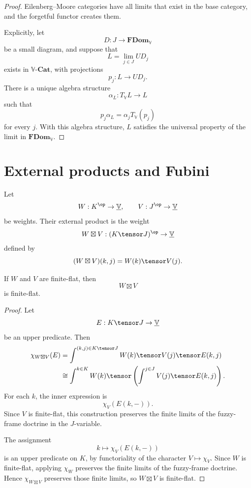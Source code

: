 \begin{proof}
Eilenberg--Moore categories have all limits that exist in the base category, and
the forgetful functor creates them.

Explicitly, let
\[
    D:J\to\mathbf{FDom}_{\mathbb V}
\]
be a small diagram, and suppose that
\[
    L=\lim_{j\in J}UD_j
\]
exists in \(\mathbb V\text{-}\mathbf{Cat}\), with projections
\[
    p_j:L\to UD_j.
\]
There is a unique algebra structure
\[
    \alpha_L:T_{\mathbb V}L\to L
\]
such that
\[
    p_j\alpha_L
    =
    \alpha_jT_{\mathbb V}(p_j)
\]
for every \(j\).  With this algebra structure, \(L\) satisfies the universal
property of the limit in \(\mathbf{FDom}_{\mathbb V}\).
\end{proof}

\section{External products and Fubini}
\label{sec:external-products-fubini-rewrite}

\begin{definition}
\label{def:external-product-weights-rewrite}
Let
\[
    W:K^{\op}\to\underline{\mathbb V},
    \qquad
    V:J^{\op}\to\underline{\mathbb V}
\]
be weights.  Their external product is the weight
\[
    W\boxtimes V:(K\tensor J)^{\op}\to\underline{\mathbb V}
\]
defined by
\[
    (W\boxtimes V)(k,j)=W(k)\tensor V(j).
\]
\end{definition}

\begin{proposition}
\label{prop:external-products-finite-flat-rewrite}
If \(W\) and \(V\) are finite-flat, then
\[
    W\boxtimes V
\]
is finite-flat.
\end{proposition}

\begin{proof}
Let
\[
    E:K\tensor J\to\underline{\mathbb V}
\]
be an upper predicate.  Then
\[
\begin{aligned}
    \chi_{W\boxtimes V}(E)
    &=
    \int^{(k,j)\in K\tensor J}
        W(k)\tensor V(j)\tensor E(k,j)
    \\
    &\cong
    \int^{k\in K}
        W(k)\tensor
        \left(
            \int^{j\in J}
                V(j)\tensor E(k,j)
        \right).
\end{aligned}
\]
For each \(k\), the inner expression is
\[
    \chi_V(E(k,-)).
\]
Since \(V\) is finite-flat, this construction preserves the finite limits of the
fuzzy-frame doctrine in the \(J\)-variable.

The assignment
\[
    k\longmapsto \chi_V(E(k,-))
\]
is an upper predicate on \(K\), by functoriality of the character
\(V\mapsto\chi_V\).  Since \(W\) is finite-flat, applying \(\chi_W\) preserves
the finite limits of the fuzzy-frame doctrine.  Hence \(\chi_{W\boxtimes V}\)
preserves those finite limits, so \(W\boxtimes V\) is finite-flat.
\end{proof}

